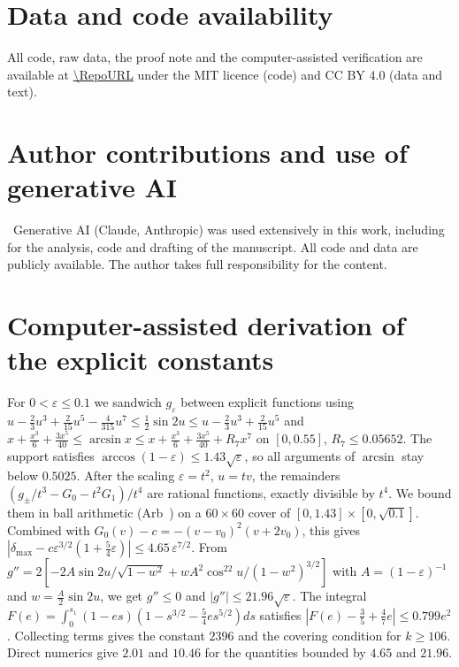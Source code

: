 \documentclass[pre,twocolumn,superscriptaddress,nofootinbib]{revtex4-2}
\begin{document}
\section*{Data and code availability}
All code, raw data, the proof note and the computer-assisted verification are available at \url{\RepoURL} under the MIT licence (code) and CC BY 4.0 (data and text).

\section*{Author contributions and use of generative AI}
\ContribEn\
Generative AI (Claude, Anthropic) was used extensively in this work, including for the analysis, code and drafting of the manuscript.
All code and data are publicly available.
The author takes full responsibility for the content.

\appendix
\section{Computer-assisted derivation of the explicit constants}\label{app:rigorous}
For $0<\varepsilon\le0.1$ we sandwich $g_\varepsilon$ between explicit functions using
$u-\tfrac23u^3+\tfrac2{15}u^5-\tfrac4{315}u^7\le\tfrac12\sin2u\le u-\tfrac23u^3+\tfrac2{15}u^5$ and
$x+\tfrac{x^3}6+\tfrac{3x^5}{40}\le\arcsin x\le x+\tfrac{x^3}6+\tfrac{3x^5}{40}+R_7x^7$ on $[0,0.55]$, $R_7\le0.05652$.
The support satisfies $\arccos(1-\varepsilon)\le1.43\sqrt\varepsilon$, so all arguments of $\arcsin$ stay below $0.5025$.
After the scaling $\varepsilon=t^2$, $u=tv$, the remainders $(g_\pm/t^3-G_0-t^2G_1)/t^4$ are rational functions, exactly divisible by $t^4$.
We bound them in ball arithmetic (Arb~\cite{Arb}) on a $60\times60$ cover of $[0,1.43]\times[0,\sqrt{0.1}]$.
Combined with $G_0(v)-c=-(v-v_0)^2(v+2v_0)$, this gives
$|\delta_{\max}-c\varepsilon^{3/2}(1+\tfrac54\varepsilon)|\le4.65\,\varepsilon^{7/2}$.
From $g''=2[-2A\sin2u/\sqrt{1-w^2}+wA^2\cos^22u/(1-w^2)^{3/2}]$ with $A=(1-\varepsilon)^{-1}$ and $w=\tfrac A2\sin2u$, we get $g''\le0$ and $|g''|\le21.96\sqrt\varepsilon$.
The integral $F(e)=\int_0^{s_1}(1-es)(1-s^{3/2}-\tfrac54es^{5/2})ds$ satisfies $|F(e)-\tfrac35+\tfrac47e|\le0.799e^2$.
Collecting terms gives the constant $2396$ and the covering condition for $k\ge106$.
Direct numerics give $2.01$ and $10.46$ for the quantities bounded by $4.65$ and $21.96$.
\end{document}
